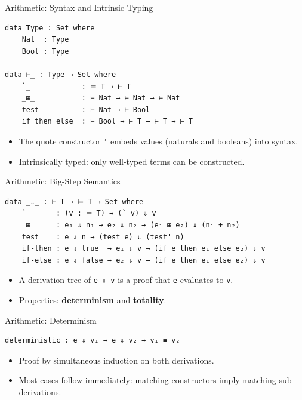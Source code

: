 \documentclass[10pt,compress,aspectratio=169]{beamer}
\begin{document}
\begin{frame}[fragile]{Arithmetic: Syntax and Intrinsic Typing}
\begin{verbatim}
data Type : Set where
    Nat  : Type
    Bool : Type

data ⊢_ : Type → Set where
    `_            : ⊨ T → ⊢ T
    _⊞_           : ⊢ Nat → ⊢ Nat → ⊢ Nat
    test          : ⊢ Nat → ⊢ Bool
    if_then_else_ : ⊢ Bool → ⊢ T → ⊢ T → ⊢ T
\end{verbatim}
\begin{itemize}
    \item The quote constructor \texttt{`} embeds values (naturals and booleans) into syntax.
    \item Intrinsically typed: only well-typed terms can be constructed.
\end{itemize}
\end{frame}

\begin{frame}[fragile]{Arithmetic: Big-Step Semantics}
\begin{verbatim}
data _⇓_ : ⊢ T → ⊨ T → Set where
    `_      : (v : ⊨ T) → (` v) ⇓ v
    _⊞_     : e₁ ⇓ n₁ → e₂ ⇓ n₂ → (e₁ ⊞ e₂) ⇓ (n₁ + n₂)
    test    : e ⇓ n → (test e) ⇓ (test' n)
    if-then : e ⇓ true  → e₁ ⇓ v → (if e then e₁ else e₂) ⇓ v
    if-else : e ⇓ false → e₂ ⇓ v → (if e then e₁ else e₂) ⇓ v
\end{verbatim}
\begin{itemize}
    \item A derivation tree of \texttt{e ⇓ v} is a proof that \texttt{e} evaluates to \texttt{v}.
    \item Properties: \textbf{determinism} and \textbf{totality}.
\end{itemize}
\end{frame}

\begin{frame}[fragile]{Arithmetic: Determinism}
\begin{verbatim}
deterministic : e ⇓ v₁ → e ⇓ v₂ → v₁ ≡ v₂
\end{verbatim}
\begin{itemize}
    \item Proof by simultaneous induction on both derivations.
    \item Most cases follow immediately: matching constructors imply matching sub-derivations.
\end{itemize}
\end{frame}
\end{document}
